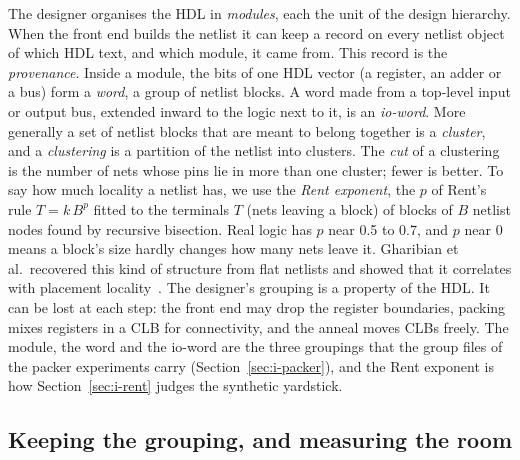 The designer organises the HDL in \emph{modules}, each the unit of the design hierarchy. %
When the front end builds the netlist it can keep a record on every netlist object of which HDL text, and which module, it came from. This record is the \emph{provenance}. %
Inside a module, the bits of one HDL vector (a register, an adder or a bus) form a \emph{word}, a group of netlist blocks. %
A word made from a top-level input or output bus, extended inward to the logic next to it, is an \emph{io-word}. %
More generally a set of netlist blocks that are meant to belong together is a \emph{cluster}, and a \emph{clustering} is a partition of the netlist into clusters. %
The \emph{cut} of a clustering is the number of nets whose pins lie in more than one cluster; fewer is better. %
To say how much locality a netlist has, we use the \emph{Rent exponent}, the $p$ of Rent's rule $T=k\,B^{p}$ fitted to the terminals $T$ (nets leaving a block) of blocks of $B$ netlist nodes found by recursive bisection. %
Real logic has $p$ near 0.5 to 0.7, and $p$ near 0 means a block's size hardly changes how many nets leave it.
Gharibian et al.\ recovered this kind of structure from flat netlists and showed that it correlates with placement locality~\cite{gharibian2010finding,gharibian2013analyzing}. The designer's grouping is a property of the HDL. It can be lost at each step: the front end may drop the register boundaries, packing mixes registers in a CLB for connectivity, and the anneal moves CLBs freely. The module, the word and the io-word are the three groupings that the group files of the packer experiments carry (Section~\ref{sec:i-packer}), and the Rent exponent is how Section~\ref{sec:i-rent} judges the synthetic yardstick.

\subsection{Keeping the grouping, and measuring the room}

